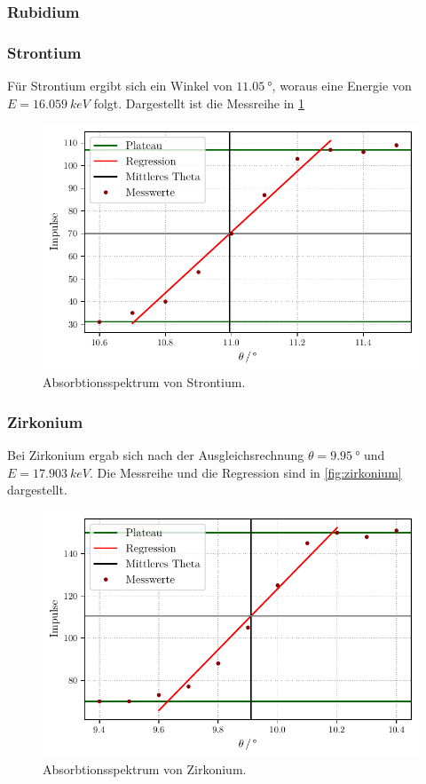\subsubsection{Rubidium}



\subsubsection{Strontium}
Für Strontium ergibt sich ein Winkel von $\qty{11.05}{°}$, woraus eine Energie von $E = \qty{16.059}{keV}$ folgt.
Dargestellt ist die Messreihe in \ref{fig:strontium}
\begin{figure}[H]
  \centering
  \caption{Absorbtionsspektrum von Strontium.}
  \label{fig:strontium}
  \includegraphics[width=0.5 \linewidth]{build/strontium.pdf}
\end{figure}

\subsubsection{Zirkonium}
Bei Zirkonium ergab sich nach der Ausgleichsrechnung $\theta = \qty{9.95}{°}$ und $E = \qty{17.903}{keV}$.
Die Messreihe und die Regression sind in \autoref{fig:zirkonium} dargestellt.
\begin{figure}[H]
  \centering
  \caption{Absorbtionsspektrum von Zirkonium.}
  \label{fig:zirkonium}
  \includegraphics[width=0.5 \linewidth]{build/zirkonium.pdf}
\end{figure}

